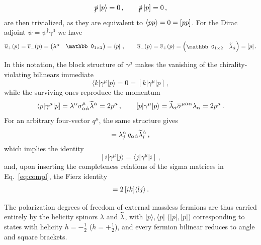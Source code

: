 \begin{align}
    \slashed{p} \ket{p} = 0 \,, \qquad \slashed{p}\, |p] = 0\,,
\end{align}
are then trivialized, as they are equivalent to $\langle p p \rangle=0=\lbrack p p \rbrack$.
%
For the Dirac adjoint $\overline \psi = \psi^\dagger \gamma^0$ we have
\begin{gather}
    \overline u_+(p) = \overline v_- (p)  
    = \begin{pmatrix}
        \lambda^\alpha & \mathbb 0_{1\times 2}
    \end{pmatrix}
    = \bra{p}\,,
\qquad
    \overline u_-(p) = \overline v_+ (p) 
    = \begin{pmatrix}
        \mathbb 0_{1\times 2} & \tildee\lambda_{\dot\alpha}
    \end{pmatrix}
    = [p| \,.
\end{gather}

In this notation, the block structure of $\gamma^\mu$ makes the vanishing of the chirality-violating
bilinears immediate
\begin{equation}
    \langle k| \gamma^\mu | p \rangle = 0 = [k|\gamma^\mu|p]\,,
\end{equation}
while the surviving ones reproduce the momentum
\begin{equation}
    \langle p |\gamma^\mu|p] = \lambda^\alpha \sigma^\mu_{\alpha\dot\alpha}\widetilde{\lambda}^{\dot\alpha} = 2p^\mu\,,
    \qquad
    [p|\gamma^\mu|p\rangle = \widetilde{\lambda}_{\dot\alpha} \overline\sigma^{\mu\dot\alpha\alpha}\lambda_\alpha = 2p^\mu\,.
\end{equation}
For an arbitrary four-vector $q^\mu$, the same structure gives
\begin{align}
    [i|\sls q|j\rangle = \tildee\lambda_{i\,\dot\alpha}\,q^{\dot\alpha \alpha}\lambda_{j\,\alpha}\,, \qquad
    \langle j |\sls q|i] = \lambda_j^\alpha\, q_{\alpha\dot\alpha}\tildee\lambda_i^{\dot\alpha}\,,
\end{align}
which implies the identity
\begin{equation}\label{eq:idgamma}
    [i|\gamma^\mu|j\rangle = \langle j |\gamma^\mu |i]\,,
\end{equation}
and, upon inserting the completeness relations of the sigma matrices in Eq.~\eqref{eq:compl}, the
Fierz identity
\begin{gather}
    [i|\gamma^\mu |j\rangle\langle l |\gamma_\mu |k] = 2\,\sqr{i}{k}\agl{l}{j}\,.
\end{gather}

The polarization degrees of freedom of external massless fermions are thus carried entirely by the
helicity spinors $\lambda$ and $\widetilde{\lambda}$, with $|p\rangle,\langle p|$ ($|p],[ p|$) corresponding to states with helicity $h=-\frac{1}{2}$ ($h=+\frac{1}{2}$), and every fermion bilinear reduces to angle and
square brackets.

